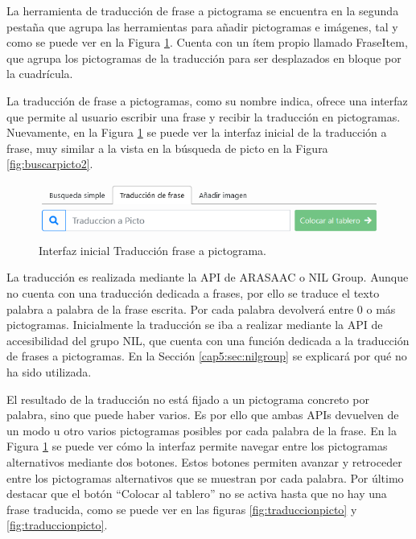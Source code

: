 La herramienta de traducción de frase a pictograma se encuentra en la segunda pestaña que agrupa las herramientas para añadir pictogramas e imágenes, tal y como se puede ver en la Figura \ref{fig:traducirfraseinicial}. Cuenta con un ítem propio llamado FraseItem, que agrupa los pictogramas de la traducción para ser desplazados en bloque por la cuadrícula.

La traducción de frase a pictogramas, como su nombre indica, ofrece una interfaz que permite al usuario escribir una frase y recibir la traducción en pictogramas. Nuevamente, en la Figura \ref{fig:traducirfraseinicial} se puede ver la interfaz inicial de la traducción a frase, muy similar a la vista en la búsqueda de picto en la Figura \ref{fig:buscarpicto2}. 

\begin{figure}[h!]
	\centering
	\includegraphics[width=0.7\linewidth]{Imagenes/Bitmap/traducirFraseInicial}
	\caption{Interfaz inicial Traducción frase a pictograma.}
	\label{fig:traducirfraseinicial}
\end{figure}


La traducción es realizada mediante la API de ARASAAC o NIL Group. Aunque no cuenta con una traducción dedicada a frases, por ello se traduce el texto palabra a palabra de la frase escrita. Por cada palabra devolverá entre 0 o más pictogramas. Inicialmente la traducción se iba a realizar mediante la API de accesibilidad del grupo NIL, que cuenta con una función dedicada a la traducción de frases a pictogramas. En la Sección \ref{cap5:sec:nilgroup} se explicará por qué no ha sido utilizada. 


El resultado de la traducción no está fijado a un pictograma concreto por palabra, sino que puede haber varios. Es por ello que ambas APIs devuelven de un modo u otro varios pictogramas posibles por cada palabra de la frase.  En la Figura \ref{fig:traducirfraseinicial} se puede ver cómo la interfaz permite navegar entre los pictogramas alternativos mediante dos botones.
Estos botones permiten avanzar y retroceder entre los pictogramas alternativos que se muestran por cada palabra. Por último destacar que el botón “Colocar al tablero” no se activa hasta que no hay una frase traducida, como se puede ver en las figuras \ref{fig:traduccionpicto} y \ref{fig:traduccionpicto}. 

